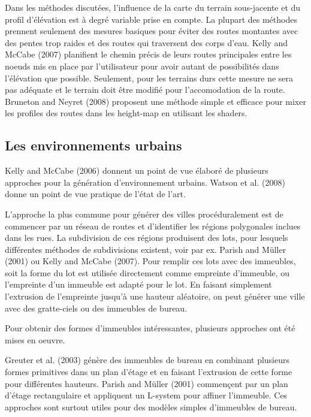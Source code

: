 \documentclass[11pt]{article}
\begin{document}
Dans les méthodes discutées, l'influence de la carte du terrain sous-jacente et du profil d'élévation est à degré variable prise en compte. La plupart des méthodes prennent seulement des mesures basiques pour éviter des routes montantes avec des pentes trop raides et des routes qui traversent des corps d'eau. Kelly and McCabe (2007) planifient le chemin précis de leurs routes principales entre les noeuds mis en place par l'utilisateur pour avoir autant de possibilités dans l'élévation que possible. Seulement, pour les terrains durs cette mesure ne sera pas adéquate et le terrain doit être modifié pour l'accomodation de la route. Bruneton and Neyret (2008) proposent une méthode simple et efficace pour mixer les profiles des routes dans les height-map en utilisant les shaders.

\subsection*{Les environnements urbains}

Kelly and McCabe (2006) donnent un point de vue élaboré de plusieurs approches pour la génération d'environnement urbains. Watson et al. (2008) donne un point de vue pratique de l'état de l'art. \newline

L'approche la plus commune pour générer des villes procéduralement est de commencer par un réseau de routes et d'identifier les régions polygonales inclues dans les rues. La subdivision de ces régions produisent des lots, pour lesquels différentes méthodes de subdivisions existent, voir par ex. Parish and Müller (2001) ou Kelly and McCabe (2007). Pour remplir ces lots avec des immeubles, soit la forme du lot est utilisée directement comme empreinte d'immeuble, ou l'empreinte d'un immeuble est adapté pour le lot. En faisant simplement l'extrusion de l'empreinte jusqu'à une hauteur aléatoire, on peut générer une ville avec des gratte-ciels ou des immeubles de bureau. 

Pour obtenir des formes d'immeubles intéressantes, plusieurs approches ont été mises en oeuvre.\newline

Greuter et al. (2003) génère des immeubles de bureau en combinant plusieurs formes primitives dans un plan d'étage et en faisant l'extrusion de cette forme pour différentes hauteurs. Parish and Müller (2001) commençent par un plan d'étage rectangulaire et appliquent un L-system pour affiner l'immeuble. Ces approches sont surtout utiles pour des modèles simples d'immeubles de bureau.  \newline
\end{document}
